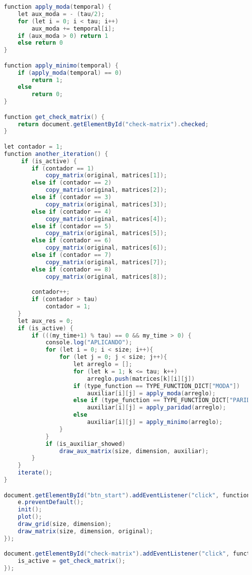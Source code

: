 \documentclass[a4paper,12pt]{article}
\begin{document}
\begin{lstlisting}[language=Java]
function apply_moda(temporal) {
    let aux_moda = - (tau/2);
    for (let i = 0; i < tau; i++)
        aux_moda += temporal[i];
    if (aux_moda > 0) return 1
    else return 0
}

function apply_minimo(temporal) {
    if (apply_moda(temporal) == 0)
        return 1;
    else
        return 0;
}

function get_check_matrix() {
    return document.getElementById("check-matrix").checked;
}

let contador = 1;
function another_iteration() {
     if (is_active) {
        if (contador == 1)
            copy_matrix(original, matrices[1]);
        else if (contador == 2)
            copy_matrix(original, matrices[2]);
        else if (contador == 3)
            copy_matrix(original, matrices[3]);
        else if (contador == 4)
            copy_matrix(original, matrices[4]);
        else if (contador == 5)
            copy_matrix(original, matrices[5]);
        else if (contador == 6)
            copy_matrix(original, matrices[6]);
        else if (contador == 7)
            copy_matrix(original, matrices[7]);
        else if (contador == 8)
            copy_matrix(original, matrices[8]);

        contador++;
        if (contador > tau)
            contador = 1;
    }
    let aux_res = 0;
    if (is_active) {
        if (((my_time+1) % tau) == 0 && my_time > 0) {
            console.log("APLICANDO");
            for (let i = 0; i < size; i++){
                for (let j = 0; j < size; j++){
                    let arreglo = [];
                    for (let k = 1; k <= tau; k++)
                        arreglo.push(matrices[k][i][j])
                    if (type_function == TYPE_FUNCTION_DICT["MODA"])
                        auxiliar[i][j] = apply_moda(arreglo);
                    else if (type_function == TYPE_FUNCTION_DICT["PARIDAD"])
                        auxiliar[i][j] = apply_paridad(arreglo);
                    else
                        auxiliar[i][j] = apply_minimo(arreglo);
                }
            }
            if (is_auxiliar_showed)
                draw_aux_matrix(size, dimension, auxiliar);
        }
    }
    iterate();
}

document.getElementById("btn_start").addEventListener("click", function click(e) {
    e.preventDefault();
    init();
    plot();
    draw_grid(size, dimension);
    draw_matrix(size, dimension, original);
});

document.getElementById("check-matrix").addEventListener("click", function click(e) {
    is_active = get_check_matrix();
});


\end{lstlisting}
\end{document}
